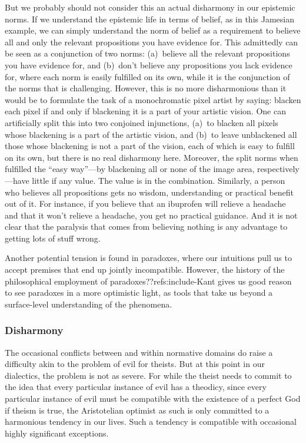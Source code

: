 But we probably should not consider this an actual disharmony in our epistemic norms. If we understand the epistemic
life in terms of belief, as in this Jamesian example, we can simply understand the norm of belief as a requirement to believe 
all and only the relevant propositions you have evidence for. This admittedly can be seen as a conjunction of 
two norms: (a)~believe all the relevant propositions you have evidence for, and (b)~don't believe any propositions 
you lack evidence for, where each norm is easily fulfilled on its own, while it is the conjunction of the norms that 
is challenging. However, this is no more disharmonious than it would be to formulate the task of a monochromatic pixel
artist by saying: blacken each pixel if and only if blackening it is a part of your artistic vision. One can artificially
split this into two conjoined injunctions, (a)~to blacken all pixels whose blackening is a part of the artistic vision, and (b)~to 
leave unblackened all those whose blackening is not a part of the vision, each of which is easy to fulfill on its own, but there
is no real disharmony here. Moreover, the split norms when fulfilled the ``easy way''---by blackening all or none of the 
image area, respectively---have little if any value. The value is in the combination. Similarly, a person who believes 
all propositions gets no wisdom, understanding or practical benefit out of it. For instance, if you believe that an ibuprofen 
will relieve a headache and that it won't relieve a headache, you get no practical guidance. And it is not clear that 
the paralysis that comes from believing nothing is any advantage to getting lots of stuff wrong.

Another potential tension is found in paradoxes, where our intuitions pull us to accept premises that end up jointly 
incompatible. However, the history of the philosophical employment of paradoxes??refs:include-Kant gives us good reason to see paradoxes in a more optimistic light, as tools that take us beyond
a surface-level understanding of the phenomena. 

\subsubsection{Disharmony}
The occasional conflicts between and within normative domains do raise a difficulty akin to the problem of evil for theists.
But at this point in our dialectics, the problem is not as severe. For while the theist needs to commit to the idea that 
every particular instance of evil has a theodicy, since every particular instance of evil must be compatible with the existence
of a perfect God if theism is true, the Aristotelian optimist as such is only committed to a harmonious tendency in our 
lives. Such a tendency is compatible with occasional highly significant exceptions.

